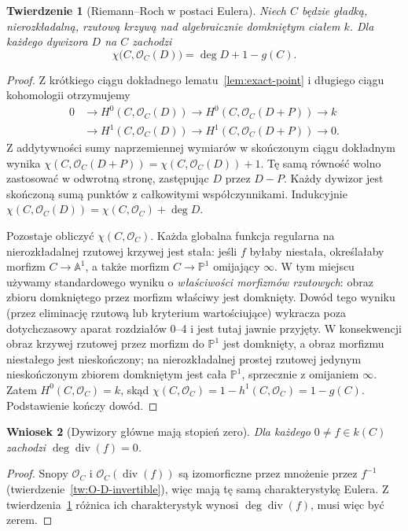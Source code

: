 \documentclass[11pt,a4paper,openany]{report}
\numberwithin{equation}{section}
\theoremstyle{plain}
\newtheorem{twierdzenie}{Twierdzenie}[section]
\newtheorem{wniosek}[twierdzenie]{Wniosek}
\theoremstyle{definition}
\theoremstyle{remark}
\newcommand{\A}{\mathbb A}
\newcommand{\PP}{\mathbb P}
\begin{document}
\begin{twierdzenie}[Riemann--Roch w postaci Eulera]
\label{tw:rr-euler}
Niech $C$ będzie gładką, nierozkładalną,
rzutową krzywą nad algebraicznie domkniętym
ciałem $k$. Dla każdego dywizora $D$ na $C$
zachodzi
\[
 \chi\bigl(C,\mathcal O_C(D)\bigr)
   =\deg D+1-g(C).
\]
\end{twierdzenie}
\begin{proof}
Z krótkiego ciągu dokładnego
lematu~\ref{lem:exact-point} i długiego ciągu
kohomologii otrzymujemy
\[
\begin{aligned}
0&\longrightarrow H^0(C,\mathcal O_C(D))
\longrightarrow H^0(C,\mathcal O_C(D+P))
\longrightarrow k\\
&\longrightarrow H^1(C,\mathcal O_C(D))
\longrightarrow H^1(C,\mathcal O_C(D+P))
\longrightarrow0.
\end{aligned}
\]
Z addytywności sumy naprzemiennej wymiarów
w skończonym ciągu dokładnym wynika
$\chi(C,\mathcal O_C(D+P))=
\chi(C,\mathcal O_C(D))+1$.
Tę samą równość wolno zastosować w odwrotną
stronę, zastępując $D$ przez $D-P$.
Każdy dywizor jest skończoną sumą punktów
z całkowitymi współczynnikami. Indukcyjnie
$\chi(C,\mathcal O_C(D))=
\chi(C,\mathcal O_C)+\deg D$.

Pozostaje obliczyć $\chi(C,\mathcal O_C)$.
Każda globalna funkcja regularna na nierozkładalnej
rzutowej krzywej jest stała: jeśli $f$ byłaby
niestała, określałaby morfizm $C\to\A^1$,
a także morfizm $C\to\PP^1$ omijający
$\infty$. W tym miejscu używamy standardowego
wyniku o \emph{właściwości morfizmów rzutowych}:
obraz zbioru domkniętego przez morfizm właściwy
jest domknięty. Dowód tego wyniku (przez eliminację
rzutową lub kryterium wartościujące) wykracza poza
dotychczasowy aparat rozdziałów 0--4 i jest tutaj
jawnie przyjęty. W konsekwencji obraz krzywej
rzutowej przez morfizm do $\PP^1$ jest domknięty,
a obraz morfizmu niestałego jest nieskończony;
na nierozkładalnej prostej rzutowej jedynym
nieskończonym zbiorem domkniętym jest cała
$\PP^1$, sprzecznie z omijaniem $\infty$.
Zatem $H^0(C,\mathcal O_C)=k$, skąd
$\chi(C,\mathcal O_C)=1-h^1(C,\mathcal O_C)=1-g(C)$.
Podstawienie kończy dowód.
\end{proof}

\begin{wniosek}[Dywizory główne mają stopień zero]
\label{wn:div-zero}
Dla każdego $0\ne f\in k(C)$ zachodzi
$\deg\operatorname{div}(f)=0$.
\end{wniosek}
\begin{proof}
Snopy $\mathcal O_C$ i
$\mathcal O_C(\operatorname{div}(f))$ są izomorficzne
przez mnożenie przez $f^{-1}$
(twierdzenie~\ref{tw:O-D-invertible}),
więc mają tę samą charakterystykę Eulera.
Z twierdzenia~\ref{tw:rr-euler} różnica
ich charakterystyk wynosi
$\deg\operatorname{div}(f)$, musi więc być zerem.
\end{proof}
\end{document}
